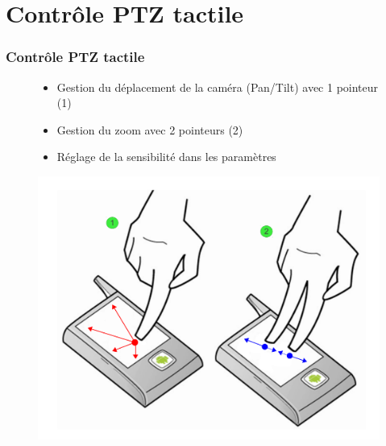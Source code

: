 
\section{Contrôle PTZ tactile}
  \begin{frame}
   \frametitle{Contrôle PTZ tactile}


\begin{figure}[H]
  \centering
    \begin{itemize}
      \item Gestion du déplacement de la caméra (Pan/Tilt) avec 1 pointeur
      (1)
      \item Gestion du zoom avec 2 pointeurs (2)
      \item Réglage de la sensibilité dans les paramètres
   	\end{itemize}
   \includegraphics[scale=0.25]{Images/ImageSlide8.pdf}
  \end{figure}  

  \end{frame}
